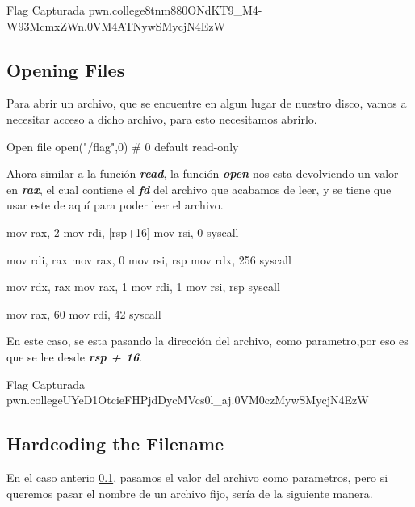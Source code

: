 \begin{flagbox}{Flag Capturada}
	pwn.college{8tnm880ONdKT9_M4-W93McmxZWn.0VM4ATNywSMycjN4EzW}
\end{flagbox}

\subsection{Opening Files}\label{subsec:opening_files}

Para abrir un archivo, que se encuentre en algun lugar de nuestro disco, vamos
a necesitar acceso a dicho archivo, para esto necesitamos abrirlo.

\begin{codebox}[C]{Open file}
	open("/flag",0) # 0 default read-only
\end{codebox}

Ahora similar a la función \textit{\textbf{read}}, la función \textit{\textbf{open}}
nos esta devolviendo un valor en \textit{\textbf{rax}}, el cual contiene
el \textit{\textbf{fd}} del archivo que acabamos de leer, y se tiene que usar
este de aquí para poder leer el archivo.

\begin{codebox}[ASM]
	mov rax, 2
	mov rdi, [rsp+16]
	mov rsi, 0
	syscall

	mov rdi, rax
	mov rax, 0
	mov rsi, rsp
	mov rdx, 256
	syscall

	mov rdx, rax
	mov rax, 1
	mov rdi, 1
	mov rsi, rsp
	syscall

	mov rax, 60
	mov rdi, 42
	syscall
\end{codebox}

\begin{infobox}
	En este caso, se esta pasando la dirección del archivo, como parametro,por eso es que se lee
	desde \textit{\textbf{rsp + 16}}.
\end{infobox}

\begin{flagbox}{Flag Capturada}
	pwn.college{UYeD1OtcieFHPjdDycMVcs0l_aj.0VM0czMywSMycjN4EzW}
\end{flagbox}

\subsection{Hardcoding the Filename}\label{subsec:hardcoding_the_filename}

En el caso anterio \ref{subsec:opening_files}, pasamos el valor del
archivo como parametros, pero si queremos pasar el nombre de un archivo fijo,
sería de la siguiente manera.

